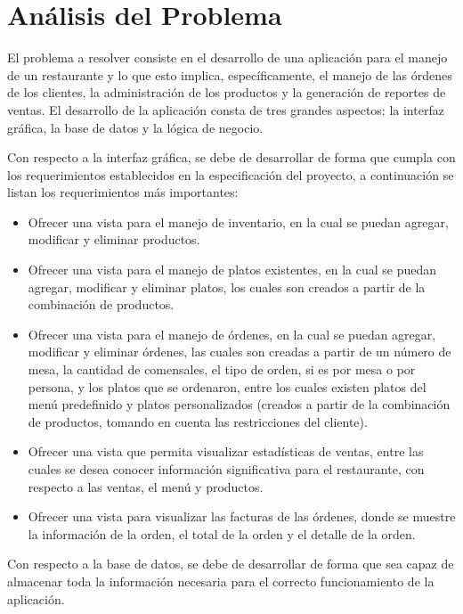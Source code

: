 \section{Análisis del Problema}

El problema a resolver consiste en el desarrollo de una aplicación para el
manejo de un restaurante y lo que esto implica, específicamente, el manejo de 
las órdenes de los clientes, la administración de los productos y la 
generación de reportes de ventas. El desarrollo de la aplicación 
consta de tres grandes aspectos: la interfaz gráfica, la base de datos y 
la lógica de negocio.

Con respecto a la interfaz gráfica, se debe de desarrollar de forma que 
cumpla con los requerimientos establecidos en la especificación del proyecto,
a continuación se listan los requerimientos más importantes:

\begin{itemize}
    \item Ofrecer una vista para el manejo de inventario, en la cual se 
    puedan agregar, modificar y eliminar productos.
    \item Ofrecer una vista para el manejo de platos existentes, en la cual
    se puedan agregar, modificar y eliminar platos, los cuales son creados 
    a partir de la combinación de productos.
    \item Ofrecer una vista para el manejo de órdenes, en la cual se puedan 
    agregar, modificar y eliminar órdenes, las cuales son creadas a partir
    de un número de mesa, la cantidad de comensales, el tipo de orden, si es 
    por mesa o por persona, y los platos que se ordenaron, entre los cuales 
    existen platos del menú predefinido y platos personalizados (creados a 
    partir de la combinación de productos, tomando en cuenta las restricciones 
    del cliente).
    \item Ofrecer una vista que permita visualizar estadísticas de ventas, 
    entre las cuales se desea conocer información significativa para el 
    restaurante, con respecto a las ventas, el menú y productos.
    \item Ofrecer una vista para visualizar las facturas de las órdenes, donde 
    se muestre la información de la orden, el total de la orden y el 
    detalle de la orden.
\end{itemize}

Con respecto a la base de datos, se debe de desarrollar de forma que sea capaz
de almacenar toda la información necesaria para el correcto funcionamiento de 
la aplicación.

